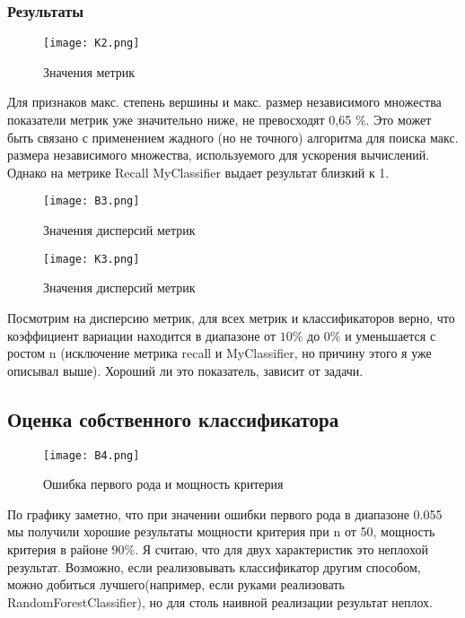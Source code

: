 \documentclass[a4paper, 12pt]{article}
\begin{document}
\subsubsection{Результаты}
\begin{figure}[H]
    \centering
    \texttt{[image: К2.png]}
    \caption{Значения метрик}
    \label{fig:uml}
\end{figure}

Для признаков макс. степень вершины и макс. размер независимого множества показатели метрик уже значительно ниже, не превосходят 0,65 \%. Это может быть связано с применением жадного (но не точного) алгоритма для поиска макс. размера независимого множества, используемого для ускорения вычислений. Однако на метрике Recall MyClassifier выдает результат близкий к 1.

\begin{figure}[H]
    \centering
    \texttt{[image: В3.png]}
    \caption{Значения дисперсий метрик}
    \label{fig:uml}
\end{figure}

\begin{figure}[H]
    \centering
    \texttt{[image: К3.png]}
    \caption{Значения дисперсий метрик}
    \label{fig:uml}
\end{figure}

Посмотрим на дисперсию метрик, для всех метрик и классификаторов верно, что коэффициент вариации находится в диапазоне от $10\%$ до $0\%$ и уменьшается с ростом n (исключение метрика recall и MyClassifier, но причину этого я уже описывал выше). Хороший ли это показатель, зависит от задачи. 

\subsection{Оценка собственного классификатора}
\begin{figure}[H]
    \centering
    \texttt{[image: В4.png]}
    \caption{Ошибка первого рода и мощность критерия}
    \label{fig:uml}
\end{figure}

По графику заметно, что при значении ошибки первого рода в диапазоне  0.055 мы получили хорошие результаты мощности критерия при n от 50, мощность критерия в районе $90\%$. Я считаю, что для двух характеристик это неплохой результат. Возможно, если реализовывать классификатор другим способом, можно добиться лучшего(например, если руками реализовать RandomForestClassifier), но для столь наивной реализации результат неплох.\\


\end{document}
